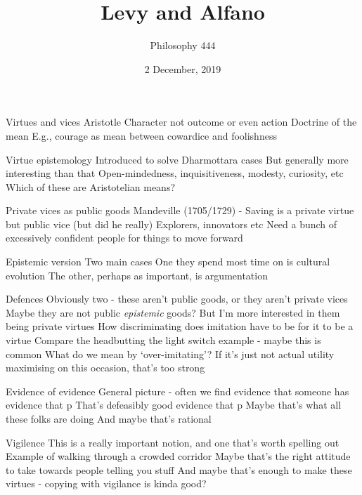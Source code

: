 \documentclass[11pt,]{article}
\title{Levy and Alfano}
\author{Philosophy 444}
\date{2 December, 2019}
\begin{document}
\maketitle

Virtues and vices Aristotle Character not outcome or even action
Doctrine of the mean E.g., courage as mean between cowardice and
foolishness

Virtue epistemology Introduced to solve Dharmottara cases But generally
more interesting than that Open-mindedness, inquisitiveness, modesty,
curiosity, etc Which of these are Aristotelian means?

Private vices as public goods Mandeville (1705/1729) - Saving is a
private virtue but public vice (but did he really) Explorers, innovators
etc Need a bunch of excessively confident people for things to move
forward

Epistemic version Two main cases One they spend most time on is cultural
evolution The other, perhaps as important, is argumentation

Defences Obviously two - these aren't public goods, or they aren't
private vices Maybe they are not public \emph{epistemic} goods? But I'm
more interested in them being private virtues How discriminating does
imitation have to be for it to be a virtue Compare the headbutting the
light switch example - maybe this is common What do we mean by
`over-imitating'? If it's just not actual utility maximising on this
occasion, that's too strong

Evidence of evidence General picture - often we find evidence that
someone has evidence that p That's defeasibly good evidence that p Maybe
that's what all these folks are doing And maybe that's rational

Vigilence This is a really important notion, and one that's worth
spelling out Example of walking through a crowded corridor Maybe that's
the right attitude to take towards people telling you stuff And maybe
that's enough to make these virtues - copying with vigilance is kinda
good?
\end{document}
